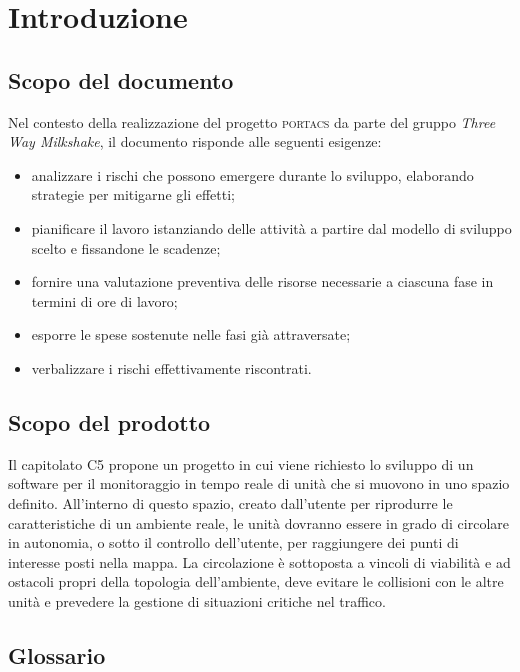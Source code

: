 \section{Introduzione}




\subsection{Scopo del documento}

Nel contesto della realizzazione del progetto \textsc{portacs} da parte del gruppo \textit{Three Way Milkshake}, il documento risponde alle seguenti esigenze: 
\begin{itemize}
	\item analizzare i rischi che possono emergere durante lo sviluppo, elaborando strategie per mitigarne gli effetti;
	\item pianificare il lavoro istanziando delle attività a partire dal modello di sviluppo scelto e fissandone le scadenze;
	\item fornire una valutazione preventiva delle risorse necessarie a ciascuna fase in termini di ore di lavoro;
	\item esporre le spese sostenute nelle fasi già attraversate;
	\item verbalizzare i rischi effettivamente riscontrati.
\end{itemize}



\subsection{Scopo del prodotto}

Il capitolato C5 propone un progetto in cui viene richiesto lo sviluppo di un software per il monitoraggio in tempo reale di unità che si muovono in uno spazio definito. All’interno di questo spazio, creato dall’utente per riprodurre le caratteristiche di un ambiente reale, le unità dovranno essere in grado di circolare in autonomia, o sotto il controllo dell’utente, per raggiungere dei punti di interesse posti nella mappa.  La circolazione è sottoposta a vincoli di viabilità e ad ostacoli propri della topologia dell’ambiente, deve evitare le collisioni con le altre unità e prevedere la gestione di situazioni critiche nel traffico.



\subsection{Glossario}



